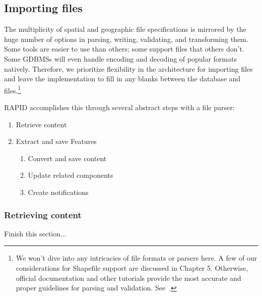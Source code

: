 \subsection{Importing files}
The multiplicity of spatial and geographic file specifications is mirrored by the huge number of options in parsing, writing, validating, and transforming them. Some tools are easier to use than others; some support files that others don't. Some GDBMSs will even handle encoding and decoding of popular formats natively. Therefore, we prioritize flexibility in the architecture for importing files and leave the implementation to fill in any blanks between the database and files.\footnote{We won't dive into any intricacies of file formats or parsers here. A few of our considerations for Shapefile support are discussed in Chapter 5. Otherwise, official documentation and other tutorials provide the most accurate and proper guidelines for parsing and validation. See~\cite{}.}

RAPID accomplishes this through several abstract steps with a file parser:

 \begin{enumerate}
   \item Retrieve content
   \item Extract and save Features
   \begin{enumerate}
     \item Convert and save content
     \item Update related components
     \item Create notifications
   \end{enumerate}
 \end{enumerate}
 
 \subsubsection{Retrieving content}
 
 Finish this section...
 
